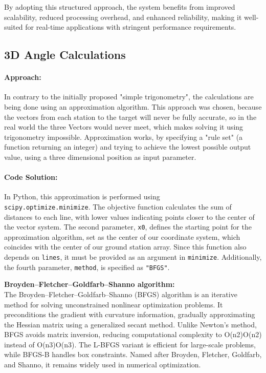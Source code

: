 By adopting this structured approach, the system benefits from improved scalability, reduced processing overhead, and enhanced reliability, making it well-suited for real-time applications with stringent performance requirements.  


\subsection{3D Angle Calculations}
\paragraph{Approach:}
In contrary to the initially proposed "simple trigonometry", the calculations are being done using an approximation algorithm. This approach was chosen, because the vectors from each station to the target will never be fully accurate, so in the real world the three Vectors would never meet, which makes solving it using trigonometry impossible. Approximation works, by specifying a "rule set" (a function returning an integer) and trying to achieve the lowest possible output value, using a three dimensional position as input parameter. 

\paragraph{Code Solution:}
In Python, this approximation is performed using \\ \texttt{scipy.optimize.minimize}. The objective function calculates the sum of distances to each line, with lower values indicating points closer to the center of the vector system. The second parameter, \texttt{x0}, defines the starting point for the approximation algorithm, set as the center of our coordinate system, which coincides with the center of our ground station array. Since this function also depends on \texttt{lines}, it must be provided as an argument in \texttt{minimize}. Additionally, the fourth parameter, \texttt{method}, is specified as \texttt{"BFGS"}.

\textbf{Broyden–Fletcher–Goldfarb–Shanno algorithm:} \\
The Broyden–Fletcher–Goldfarb–Shanno (BFGS) algorithm is an iterative method for solving unconstrained nonlinear optimization problems. It preconditions the gradient with curvature information, gradually approximating the Hessian matrix using a generalized secant method. Unlike Newton’s method, BFGS avoids matrix inversion, reducing computational complexity to O(n2)O(n2) instead of O(n3)O(n3). The L-BFGS variant is efficient for large-scale problems, while BFGS-B handles box constraints. Named after Broyden, Fletcher, Goldfarb, and Shanno, it remains widely used in numerical optimization.\citep{BFGS_wiki}

